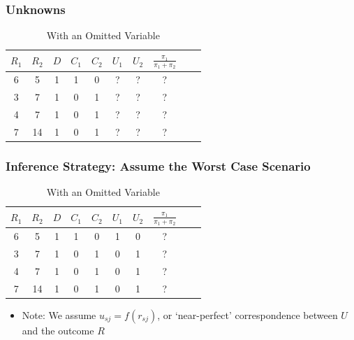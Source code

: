 \documentclass{beamer}
\begin{document}
\begin{frame}[c]\frametitle{Unknowns}
	\begin{table}
		\begin{center}
			\begin{tabular}{cccccccccc}
				$R_1$ & $R_2$ & $D$ & $C_1$ &$C_2$  & $U_1$ & $U_2$ & $\frac{\pi_1}{\pi_1 + \pi_2}$ \\ \hline
				6 & 5 & 1 & 1 & 0  & ? & ? &  ?\\
				3 & 7 & 1 & 0 & 1  & ? & ? & ?  \\
				4 & 7 & 1 & 0 & 1  & ? & ? &  ?\\
				7 & 14 & 1 & 0 & 1  & ? & ? & ? \\
			\end{tabular}
		\end{center}
		\caption{With an Omitted Variable}
	\end{table}
\end{frame}



\begin{frame}[c]\frametitle{Inference Strategy: Assume the Worst Case Scenario}
	\begin{table}
		\begin{center}
			\begin{tabular}{cccccccccc}
				$R_1$ & $R_2$ & $D$ & $C_1$ &$C_2$  & $U_1$ & $U_2$ & $\frac{\pi_1}{\pi_1 + \pi_2}$ \\ \hline
				6 & 5 & 1 & 1 & 0  & 1 & 0 &  ?\\
				3 & 7 & 1 & 0 & 1  & 0 & 1 & ?  \\
				4 & 7 & 1 & 0 & 1  & 0 & 1 &  ?\\
				7 & 14 & 1 & 0 & 1  & 0 & 1 & ? \\
			\end{tabular}
		\end{center}
		\caption{With an Omitted Variable}
	\end{table}
\begin{itemize}
\item[] Note: We assume $u_{sj}= f(r_{sj})$, or `near-perfect'
  correspondence between $U$ and the outcome $R$
\end{itemize}
\end{frame}
\end{document}
